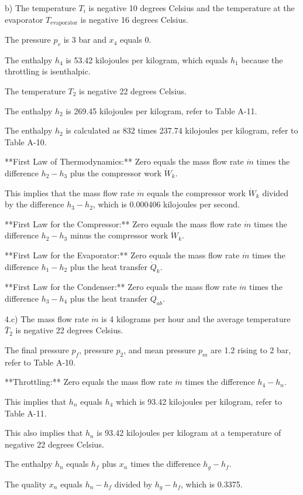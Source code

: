 b) The temperature \( T_i \) is negative 10 degrees Celsius and the temperature at the evaporator \( T_{\text{evaporator}} \) is negative 16 degrees Celsius.

The pressure \( p_v \) is 3 bar and \( x_4 \) equals 0.

The enthalpy \( h_4 \) is 53.42 kilojoules per kilogram, which equals \( h_1 \) because the throttling is isenthalpic.

The temperature \( T_2 \) is negative 22 degrees Celsius.

The enthalpy \( h_2 \) is 269.45 kilojoules per kilogram, refer to Table A-11.

The enthalpy \( h_2 \) is calculated as 832 times 237.74 kilojoules per kilogram, refer to Table A-10.

**First Law of Thermodynamics:** Zero equals the mass flow rate \( \dot{m} \) times the difference \( h_2 - h_3 \) plus the compressor work \( \dot{W}_k \).

This implies that the mass flow rate \( \dot{m} \) equals the compressor work \( \dot{W}_k \) divided by the difference \( h_3 - h_2 \), which is 0.000406 kilojoules per second.

**First Law for the Compressor:** Zero equals the mass flow rate \( \dot{m} \) times the difference \( h_2 - h_3 \) minus the compressor work \( \dot{W}_k \).

**First Law for the Evaporator:** Zero equals the mass flow rate \( \dot{m} \) times the difference \( h_1 - h_2 \) plus the heat transfer \( \dot{Q}_k \).

**First Law for the Condenser:** Zero equals the mass flow rate \( \dot{m} \) times the difference \( h_3 - h_4 \) plus the heat transfer \( \dot{Q}_{ab} \).

4.c) The mass flow rate \( \dot{m} \) is 4 kilograms per hour and the average temperature \( \bar{T}_2 \) is negative 22 degrees Celsius.

The final pressure \( p_f \), pressure \( p_2 \), and mean pressure \( p_m \) are 1.2 rising to 2 bar, refer to Table A-10.

**Throttling:** Zero equals the mass flow rate \( \dot{m} \) times the difference \( h_4 - h_n \).

This implies that \( h_n \) equals \( h_4 \) which is 93.42 kilojoules per kilogram, refer to Table A-11.

This also implies that \( h_n \) is 93.42 kilojoules per kilogram at a temperature of negative 22 degrees Celsius.

The enthalpy \( h_n \) equals \( h_f \) plus \( x_n \) times the difference \( h_g - h_f \).

The quality \( x_n \) equals \( h_n - h_f \) divided by \( h_g - h_f \), which is 0.3375.